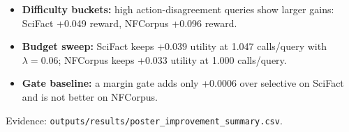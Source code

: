 \begin{itemize}
  \item \textbf{Difficulty buckets:} high action-disagreement queries show larger gains: SciFact +0.049 reward, NFCorpus +0.096 reward.
  \item \textbf{Budget sweep:} SciFact keeps +0.039 utility at 1.047 calls/query with $\lambda=0.06$; NFCorpus keeps +0.033 utility at 1.000 calls/query.
  \item \textbf{Gate baseline:} a margin gate adds only +0.0006 over selective on SciFact and is not better on NFCorpus.
\end{itemize}

\vspace{-0.4em}
{\small Evidence: \texttt{outputs/results/poster\_improvement\_summary.csv}.}
